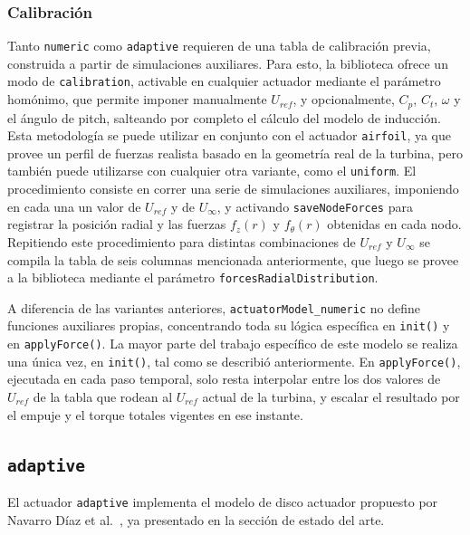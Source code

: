 \subsubsection{Calibración}
Tanto \texttt{numeric} como \texttt{adaptive} requieren de una tabla de calibración previa, construida a partir de simulaciones auxiliares. Para esto, la biblioteca ofrece un modo de \texttt{calibration}, activable en cualquier actuador mediante el parámetro homónimo, que permite imponer manualmente $U_{ref}$, y opcionalmente, $C_p$, $C_t$, $\omega$ y el ángulo de pitch, salteando por completo el cálculo del modelo de inducción. Esta metodología se puede utilizar en conjunto con el actuador \texttt{airfoil}, ya que provee un perfil de fuerzas realista basado en la geometría real de la turbina, pero también puede utilizarse con cualquier otra variante, como el \texttt{uniform}. El procedimiento consiste en correr una serie de simulaciones auxiliares, imponiendo en cada una un valor de $U_{ref}$ y de $U_\infty$, y activando \texttt{saveNodeForces} para registrar la posición radial y las fuerzas $f_z(r)$ y $f_\theta(r)$ obtenidas en cada nodo. Repitiendo este procedimiento para distintas combinaciones de $U_{ref}$ y $U_\infty$ se compila la tabla de seis columnas mencionada anteriormente, que luego se provee a la biblioteca mediante el parámetro \texttt{forcesRadialDistribution}.

A diferencia de las variantes anteriores, \texttt{actuatorModel\_numeric} no define funciones auxiliares propias, concentrando toda su lógica específica en \texttt{init()} y en \texttt{applyForce()}. La mayor parte del trabajo específico de este modelo se realiza una única vez, en \texttt{init()}, tal como se describió anteriormente. En \texttt{applyForce()}, ejecutada en cada paso temporal, solo resta interpolar entre los dos valores de $U_{ref}$ de la tabla que rodean al $U_{ref}$ actual de la turbina, y escalar el resultado por el empuje y el torque totales vigentes en ese instante.

\subsection{\texttt{adaptive}}
El actuador \texttt{adaptive} implementa el modelo de disco actuador propuesto por Navarro Díaz et al.~\citep{navarrodiaz2019}, ya presentado en la sección de estado del arte.

